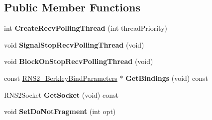 \subsection*{Public Member Functions}
\begin{DoxyCompactItemize}
\item 
\hypertarget{class_rak_net_1_1_r_n_s2___berkley_a281b308d1e7c0088a83108631f1a23b6}{int {\bfseries Create\-Recv\-Polling\-Thread} (int thread\-Priority)}\label{class_rak_net_1_1_r_n_s2___berkley_a281b308d1e7c0088a83108631f1a23b6}

\item 
\hypertarget{class_rak_net_1_1_r_n_s2___berkley_a2b1e58d9e09e6d724d6a40b539eedecb}{void {\bfseries Signal\-Stop\-Recv\-Polling\-Thread} (void)}\label{class_rak_net_1_1_r_n_s2___berkley_a2b1e58d9e09e6d724d6a40b539eedecb}

\item 
\hypertarget{class_rak_net_1_1_r_n_s2___berkley_aa699693f8507cc8442c1a809c807573d}{void {\bfseries Block\-On\-Stop\-Recv\-Polling\-Thread} (void)}\label{class_rak_net_1_1_r_n_s2___berkley_aa699693f8507cc8442c1a809c807573d}

\item 
\hypertarget{class_rak_net_1_1_r_n_s2___berkley_ae49c307791eefc5dd6d73579ab0cc29a}{const \hyperlink{struct_rak_net_1_1_r_n_s2___berkley_bind_parameters}{R\-N\-S2\-\_\-\-Berkley\-Bind\-Parameters} $\ast$ {\bfseries Get\-Bindings} (void) const }\label{class_rak_net_1_1_r_n_s2___berkley_ae49c307791eefc5dd6d73579ab0cc29a}

\item 
\hypertarget{class_rak_net_1_1_r_n_s2___berkley_a97fab0e1aa27ff186c4df5ab10f664f2}{R\-N\-S2\-Socket {\bfseries Get\-Socket} (void) const }\label{class_rak_net_1_1_r_n_s2___berkley_a97fab0e1aa27ff186c4df5ab10f664f2}

\item 
\hypertarget{class_rak_net_1_1_r_n_s2___berkley_a1253eb6bc23d78e672214c4f9d7ae8ea}{void {\bfseries Set\-Do\-Not\-Fragment} (int opt)}\label{class_rak_net_1_1_r_n_s2___berkley_a1253eb6bc23d78e672214c4f9d7ae8ea}

\end{DoxyCompactItemize}
